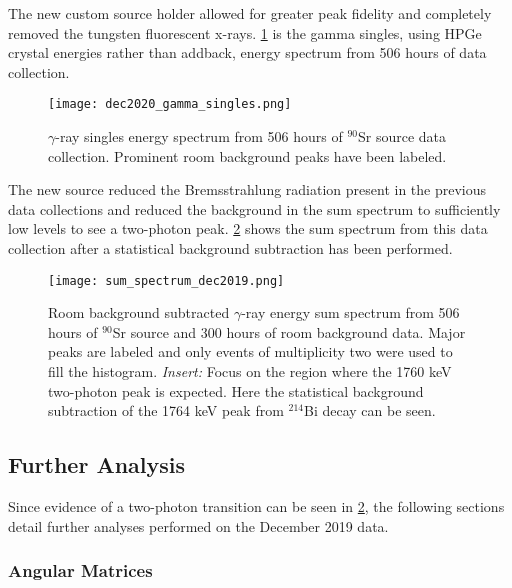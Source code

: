 \documentclass[cnatzke_thesis_proposal.tex]{subfiles}
\begin{document}
The new custom source holder allowed for greater peak fidelity and completely removed the tungsten fluorescent x-rays.
\ref{fig:dec2020_gamma_singles} is the gamma singles, using HPGe crystal energies rather than addback, energy spectrum from 506 hours of data collection.

\begin{figure}[htbp]
  \centering
  \texttt{[image: dec2020\_gamma\_singles.png]}
  \caption{$\gamma$-ray singles energy spectrum from 506 hours of $^{90}$Sr source data collection. Prominent room background peaks have been labeled.}
  \label{fig:dec2020_gamma_singles}
\end{figure}

The new source reduced the Bremsstrahlung radiation present in the previous data collections and reduced the background in the sum spectrum to sufficiently low levels to see a two-photon peak.
\ref{fig:sum_spectrum_dec2019} shows the sum spectrum from this data collection after a statistical background subtraction has been performed.

\begin{figure}[htbp]
  \centering
  \texttt{[image: sum\_spectrum\_dec2019.png]}
  \caption{Room background subtracted $\gamma$-ray energy sum spectrum from 506 hours of $^{90}$Sr source and 300 hours of room background data. Major peaks are labeled and only events of multiplicity two were used to fill the histogram. \textit{Insert:} Focus on the region where the 1760 keV two-photon peak is expected. Here the statistical background subtraction of the 1764 keV peak from $^{214}$Bi decay can be seen.}
  \label{fig:sum_spectrum_dec2019}
\end{figure}

\subsection{Further Analysis}
\label{sec:further_analysis}
Since evidence of a two-photon transition can be seen in \ref{fig:sum_spectrum_dec2019}, the following sections detail further analyses performed on the December 2019 data.

\subsubsection{Angular Matrices}
\label{sec:angular_matrices}
\end{document}
